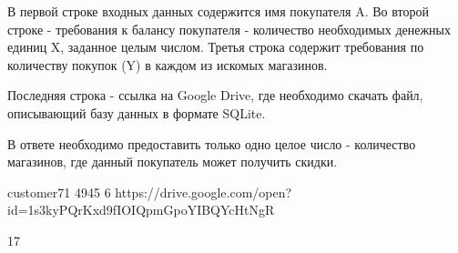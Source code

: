 
В первой строке входных данных содержится имя покупателя A. Во второй строке - требования к балансу покупателя - количество необходимых денежных единиц X, заданное целым числом. Третья строка содержит требования по количеству покупок (Y) в каждом из искомых магазинов.

Последняя строка - ссылка на Google Drive, где необходимо скачать файл, описывающий базу данных в формате SQLite.

\outputfmtSection

В ответе необходимо предоставить только одно целое число - количество магазинов, где данный покупатель может получить скидки.

\begin{myverbbox}[\small]{\vinput} 
    customer71
    4945
    6
    https://drive.google.com/open?id=1s3kyPQrKxd9fIOIQpmGpoYIBQYcHtNgR
\end{myverbbox}
\begin{myverbbox}[\small]{\voutput}
    17
\end{myverbbox}

